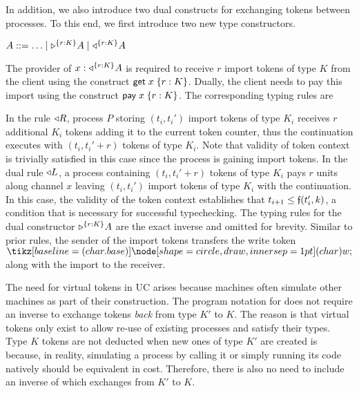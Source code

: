 In addition, we also introduce two dual constructs for exchanging tokens
between processes.
To this end, we first introduce two new type constructors.
\begin{center}
\begin{minipage}{0cm}
\begin{tabbing}
$A ::= \ldots \mid \tpaypot{A}{r : K} \mid \tgetpot{A}{r : K}$
\end{tabbing}
\end{minipage}
\end{center}
The provider of $x : \tgetpot{A}{r : K}$ is required to receive
$r$ import tokens of type $K$ from the client using the construct
$\eget{x}{r : K}$. Dually, the client needs to pay this import
using the construct $\epay{x}{r : K}$.
The corresponding typing rules are
In the rule $\getpot R$, process $P$ storing $(t_i, t_i')$ import tokens of type $K_i$
receives $r$ additional $K_i$ tokens adding it to the current token counter, thus
the continuation executes with $(t_i, t_i'+r)$ tokens of type $K_i$.
Note that validity of token context is trivially satisfied in this case since the
process is gaining import tokens.
%
In the dual rule $\getpot L$, a process containing $(t_i, t_i'+r)$ tokens of type $K_i$
pays $r$ units along channel $x$ leaving $(t_i, t_i')$ import tokens of type $K_i$ with
the continuation.
In this case, the validity of the token context establishes that $t_{i+1} \leq \GlobalF(t_i',k)$,
a condition that is necessary for successful typechecking.
The typing rules for the dual constructor $\tpaypot{A}{r : K}$
are the exact inverse and omitted for brevity.
Similar to prior rules, the sender of the import tokens transfers the write token $\wt$
along with the import to the receiver.

The need for virtual tokens in UC arises because machines often simulate
other machines as part of their construction. The program notation for 
does not require an inverse to exchange tokens \textit{back} from type $K'$ to $K$.
The reason is that virtual tokens only exist to allow re-use of existing processes 
and satisfy their types. Type $K$ tokens are not deducted when new ones of type $K'$ 
are created is because, in reality, simulating a process by calling it or simply running
its code natively should be equivalent in cost. Therefore, there is also no need to 
include an inverse of  which exchanges from $K'$ to $K$.

